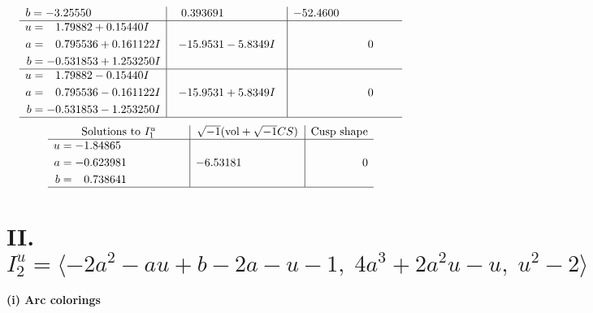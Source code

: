 \documentclass[1p]{elsarticle_modified}
\theoremstyle{definition}
\newcommand{\I}{\sqrt{-1}}
\begin{document}
$$\begin{array}{c|c|c}
\begin{aligned}
b &= -3.25550\phantom{ +0.000000I}\end{aligned}
 & \phantom{-}0.393691\phantom{ +0.000000I} & -52.4600\phantom{ +0.000000I} \\ \hline\begin{aligned}
u &= \phantom{-}1.79882 + 0.15440 I \\
a &= \phantom{-}0.795536 + 0.161122 I \\
b &= -0.531853 + 1.253250 I\end{aligned}
 & -15.9531 - 5.8349 I & \phantom{-0.000000 } 0 \\ \hline\begin{aligned}
u &= \phantom{-}1.79882 - 0.15440 I \\
a &= \phantom{-}0.795536 - 0.161122 I \\
b &= -0.531853 - 1.253250 I\end{aligned}
 & -15.9531 + 5.8349 I & \phantom{-0.000000 } 0\\
 \hline 
 \end{array}$$\newpage$$\begin{array}{c|c|c}  
\text{Solutions to }I^u_{1}& \I (\text{vol} + \sqrt{-1}CS) & \text{Cusp shape}\\
 \hline 
\begin{aligned}
u &= -1.84865\phantom{ +0.000000I} \\
a &= -0.623981\phantom{ +0.000000I} \\
b &= \phantom{-}0.738641\phantom{ +0.000000I}\end{aligned}
 & -6.53181\phantom{ +0.000000I} & \phantom{-0.000000 } 0\\
 \hline 
 \end{array}$$\newpage\newpage\renewcommand{\arraystretch}{1}
\centering \section*{II. $I^u_{2}= \langle -2 a^2- a u+b-2 a- u-1,\;4 a^3+2 a^2 u- u,\;u^2-2 \rangle$}
\flushleft \textbf{(i) Arc colorings}\\
\end{document}
